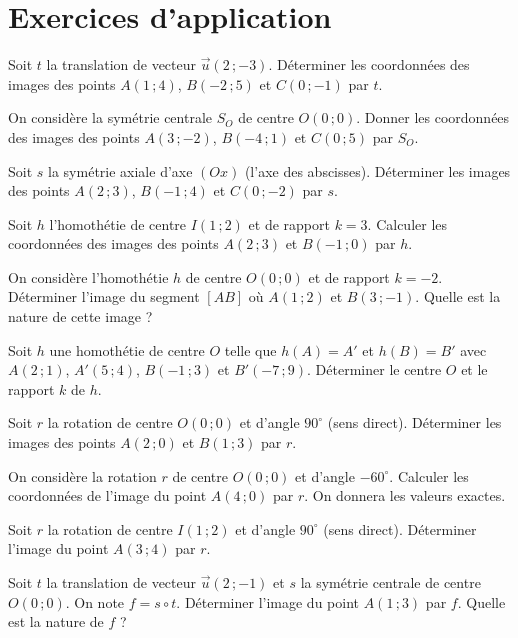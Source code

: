 \section{Exercices d'application}


\exo{}
Soit \(t\) la translation de vecteur \(\vec{u}(2\,; -3)\). Déterminer les coordonnées des images des points \(A(1\,; 4)\), \(B(-2\,; 5)\) et \(C(0\,; -1)\) par \(t\).

\exo{}
On considère la symétrie centrale \(S_O\) de centre \(O(0\,; 0)\). Donner les coordonnées des images des points \(A(3\,; -2)\), \(B(-4\,; 1)\) et \(C(0\,; 5)\) par \(S_O\).

\exo{}
Soit \(s\) la symétrie axiale d'axe \((Ox)\) (l'axe des abscisses). Déterminer les images des points \(A(2\,; 3)\), \(B(-1\,; 4)\) et \(C(0\,; -2)\) par \(s\).


\exo{}
Soit \(h\) l'homothétie de centre \(I(1\,; 2)\) et de rapport \(k = 3\). Calculer les coordonnées des images des points \(A(2\,; 3)\) et \(B(-1\,; 0)\) par \(h\).

\exo{}
On considère l'homothétie \(h\) de centre \(O(0\,; 0)\) et de rapport \(k = -2\). Déterminer l'image du segment \([AB]\) où \(A(1\,; 2)\) et \(B(3\,; -1)\). Quelle est la nature de cette image ?

\exo{}
Soit \(h\) une homothétie de centre \(O\) telle que \(h(A) = A'\) et \(h(B) = B'\) avec \(A(2\,; 1)\), \(A'(5\,; 4)\), \(B(-1\,; 3)\) et \(B'( -7\,; 9)\). Déterminer le centre \(O\) et le rapport \(k\) de \(h\).


\exo{}
Soit \(r\) la rotation de centre \(O(0\,; 0)\) et d'angle \(90^\circ\) (sens direct). Déterminer les images des points \(A(2\,; 0)\) et \(B(1\,; 3)\) par \(r\).

\exo{}
On considère la rotation \(r\) de centre \(O(0\,; 0)\) et d'angle \(-60^\circ\). Calculer les coordonnées de l'image du point \(A(4\,; 0)\) par \(r\). On donnera les valeurs exactes.

\exo{}
Soit \(r\) la rotation de centre \(I(1\,; 2)\) et d'angle \(90^\circ\) (sens direct). Déterminer l'image du point \(A(3\,; 4)\) par \(r\).


\exo{}
Soit \(t\) la translation de vecteur \(\vec{u}(2\,; -1)\) et \(s\) la symétrie centrale de centre \(O(0\,; 0)\). On note \(f = s \circ t\). Déterminer l'image du point \(A(1\,; 3)\) par \(f\). Quelle est la nature de \(f\) ?

